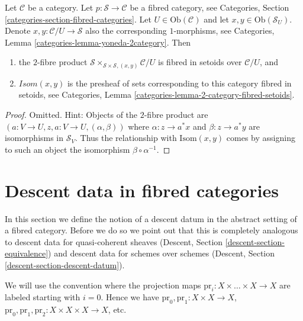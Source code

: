 \begin{lemma}
\label{lemma-isom-as-2-fibre-product}
Let $\mathcal{C}$ be a category.
Let $p : \mathcal{S} \to \mathcal{C}$ be a fibred category,
see Categories, Section \ref{categories-section-fibred-categories}.
Let $U \in \text{Ob}(\mathcal{C})$ and let $x, y \in \text{Ob}(\mathcal{S}_U)$.
Denote $x, y : \mathcal{C}/U \to \mathcal{S}$ also the corresponding
$1$-morphisms, see
Categories, Lemma \ref{categories-lemma-yoneda-2category}.
Then
\begin{enumerate}
\item the $2$-fibre product
$\mathcal{S} \times_{\mathcal{S} \times \mathcal{S}, (x, y)} \mathcal{C}/U$
is fibred in setoids over $\mathcal{C}/U$, and
\item $\mathit{Isom}(x, y)$ is the presheaf of sets corresponding
to this category fibred in setoids, see
Categories, Lemma \ref{categories-lemma-2-category-fibred-setoids}.
\end{enumerate}
\end{lemma}

\begin{proof}
Omitted. Hint: Objects of the $2$-fibre product are
$(a : V \to U, z, a : V \to U, (\alpha, \beta))$ where
$\alpha : z \to a^*x$ and $\beta : z \to a^*y$ are isomorphisms
in $\mathcal{S}_V$. Thus the relationship with $\text{Isom}(x, y)$
comes by assigning to such an object the isomorphism
$\beta \circ \alpha^{-1}$.
\end{proof}







\section{Descent data in fibred categories}
\label{section-descent-data}

\noindent
In this section we define the notion of a descent datum
in the abstract setting of a fibred category. Before we
do so we point out that this is completely analogous to
descent data for quasi-coherent sheaves
(Descent, Section \ref{descent-section-equivalence})
and descent data for schemes over schemes
(Descent, Section \ref{descent-section-descent-datum}).

\medskip\noindent
We will use the convention where the projection maps
$\text{pr}_i : X \times \ldots \times X \to X$
are labeled starting with $i = 0$. Hence we have
$\text{pr}_0, \text{pr}_1 : X \times X  \to X$,
$\text{pr}_0, \text{pr}_1, \text{pr}_2 : X \times X \times X  \to X$,
etc.

